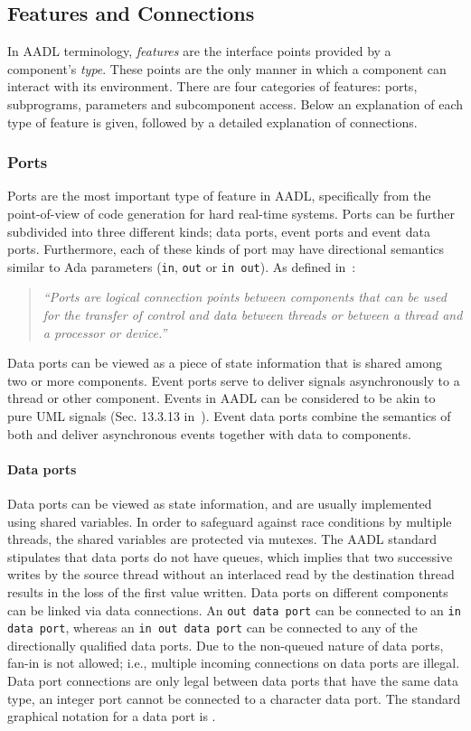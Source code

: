 \subsection{Features and Connections}
In AADL terminology, \emph{features} are the interface points provided
by a component's \emph{type}. These points are the only manner in
which a component can interact with its environment. There are four
categories of features: ports, subprograms, parameters and
subcomponent access. Below an explanation of each type of feature is
given, followed by a detailed explanation of connections.

\subsubsection{Ports}
Ports are the most important type of feature in AADL, specifically
from the point-of-view of code generation for hard real-time
systems. Ports can be further subdivided into three different kinds;
data ports, event ports and event data ports. Furthermore, each of
these kinds of port may have directional semantics similar to Ada
parameters (\texttt{in}, \texttt{out} or \texttt{in out}). As defined
in~\cite{AS5506}:

\begin{quote}
\emph{``Ports are logical connection points between components that
  can be used for the transfer of control and data between threads or
  between a thread and a processor or device.''}
\end{quote}

Data ports can be viewed as a piece of state information that is
shared among two or more components. Event ports serve to deliver
signals asynchronously to a thread or other component. Events in AADL
can be considered to be akin to pure UML signals (Sec. 13.3.13
in~\cite{uml-super}). Event data ports combine the semantics of both
and deliver asynchronous events together with data to
components.

\paragraph{Data ports} Data ports can be viewed as state
information, and are usually implemented using shared variables. In
order to safeguard against race conditions by multiple threads, the
shared variables are protected via mutexes. The AADL standard
stipulates that data ports do not have queues, which implies that two
successive writes by the source thread without an interlaced read by
the destination thread results in the loss of the first value
written. Data ports on different components can be linked via data
connections. An \texttt{out data port} can be connected to an
\texttt{in data port}, whereas an \texttt{in out data port} can be
connected to any of the directionally qualified data ports. Due to the
non-queued nature of data ports, fan-in is not allowed; i.e., multiple
incoming connections on data ports are illegal. Data port
connections are only legal between data ports that have the same data
type, an integer port cannot be connected to a character data
port. The standard graphical notation for a data port is \dataport.

